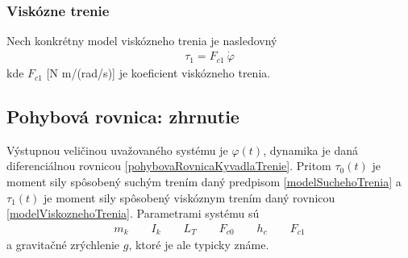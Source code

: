 \documentclass[a4paper, 10pt, ]{article}
\begin{document}
\subsubsection{Viskózne trenie}
Nech konkrétny model viskózneho trenia je nasledovný
\begin{align} \label{modelViskoznehoTrenia}
    \tau_1 = F_{c1} \ \dot \varphi
\end{align}
kde $F_{c1}$ [N m/(rad/s)] je koeficient viskózneho trenia.







\subsection{Pohybová rovnica: zhrnutie}

Výstupnou veličinou uvažovaného systému je $\varphi(t)$, dynamika je daná diferenciálnou rovnicou \eqref{pohybovaRovnicaKyvadlaTrenie}. Pritom $\tau_0(t)$ je moment sily spôsobený suchým trením daný predpisom \eqref{modelSuchehoTrenia} a $\tau_1(t)$ je moment sily spôsobený viskóznym trením daný rovnicou \eqref{modelViskoznehoTrenia}. Parametrami systému sú
\begin{align}
    m_k \qquad I_k \qquad L_T \qquad F_{c0} \qquad h_c \qquad F_{c1}
\end{align}
a gravitačné zrýchlenie $g$, ktoré je ale typicky známe.


\end{document}
